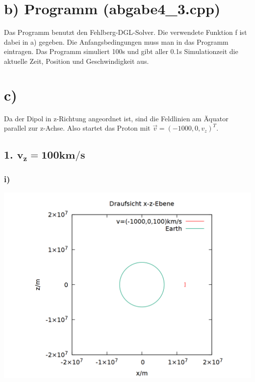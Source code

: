 \documentclass{scrreprt}
\begin{document}
\section*{b) Programm (abgabe4\_3.cpp)}
Das Programm benutzt den Fehlberg-DGL-Solver. Die verwendete Funktion f ist dabei in a) gegeben. Die Anfangsbedingungen muss man in das Programm eintragen. Das Programm simuliert 100s und gibt aller 0.1s Simulationzeit die aktuelle Zeit, Position und Geschwindigkeit aus.  

\section*{c)}
Da der Dipol in z-Richtung angeordnet ist, sind die Feldlinien am Äquator parallel zur z-Achse. Also startet das Proton mit $\vec{v} = (-1000,0,v_z)^T$.
\subsection*{1. $\mathbf{v_z = 100km/s}$}
\subsubsection*{i)}
\begin{center}
\includegraphics[scale=0.25]{plot_1_i.png}
\end{center}
\end{document}
